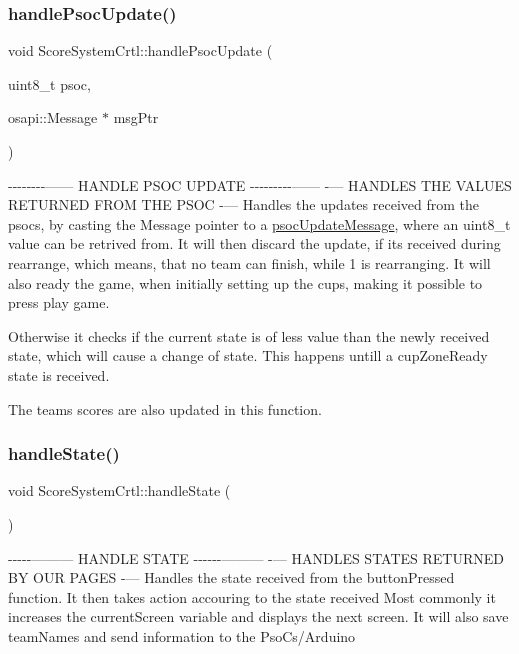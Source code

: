 \subsubsection{\texorpdfstring{handle\+Psoc\+Update()}{handlePsocUpdate()}}
{\footnotesize\ttfamily void Score\+System\+Crtl\+::handle\+Psoc\+Update (\begin{DoxyParamCaption}\item[{uint8\+\_\+t}]{psoc,  }\item[{osapi\+::\+Message $\ast$}]{msg\+Ptr }\end{DoxyParamCaption})\hspace{0.3cm}{\ttfamily [private]}}

-\/-\/-\/-\/-\/-\/-\/-\/------ H\+A\+N\+D\+LE P\+S\+OC U\+P\+D\+A\+TE -\/-\/-\/-\/-\/-\/-\/-\/-\/------ -\/--- H\+A\+N\+D\+L\+ES T\+HE V\+A\+L\+U\+ES R\+E\+T\+U\+R\+N\+ED F\+R\+OM T\+HE P\+S\+OC -\/--- Handles the updates received from the psocs, by casting the Message pointer to a \hyperlink{structpsoc_update_message}{psoc\+Update\+Message}, where an uint8\+\_\+t value can be retrived from. It will then discard the update, if its received during rearrange, which means, that no team can finish, while 1 is rearranging. It will also ready the game, when initially setting up the cups, making it possible to press play game.

Otherwise it checks if the current state is of less value than the newly received state, which will cause a change of state. This happens untill a cup\+Zone\+Ready state is received.

The teams scores are also updated in this function.\mbox{\label{class_score_system_crtl_ae36d14423417173e6b5e3c5196d76e99}} 
\subsubsection{\texorpdfstring{handle\+State()}{handleState()}}
{\footnotesize\ttfamily void Score\+System\+Crtl\+::handle\+State (\begin{DoxyParamCaption}{ }\end{DoxyParamCaption})\hspace{0.3cm}{\ttfamily [private]}}

-\/-\/-\/-\/-\/--------- H\+A\+N\+D\+LE S\+T\+A\+TE -\/-\/-\/-\/-\/-\/--------- -\/--- H\+A\+N\+D\+L\+ES S\+T\+A\+T\+ES R\+E\+T\+U\+R\+N\+ED BY O\+UR P\+A\+G\+ES -\/--- Handles the state received from the button\+Pressed function. It then takes action accouring to the state received Most commonly it increases the current\+Screen variable and displays the next screen. It will also save team\+Names and send information to the PsoC\textquotesingle{}s/\+Arduino

